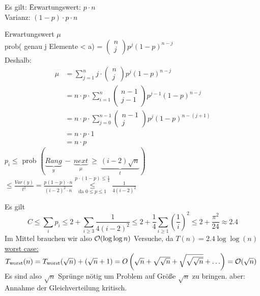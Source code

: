                 \begin{tabbing}
                    Es gilt: \= Erwartungswert: $p \cdot n$\\
                    \> Varianz: $(1-p)\cdot p \cdot n$
                \end{tabbing}
                    Erwartungswert $\mu$\\
                prob( genau j Elemente < a) = $\begin{pmatrix}
                                n \\ j
                                           \end{pmatrix} p^{j} (1-p)^{n-j}$\\
                Deshalb: 
                \begin{align*}
                    \mu &= \sum \limits_{j=1}^{n} j \cdot \begin{pmatrix}
                    n \\ j
                    \end{pmatrix} p^{j} (1-p)^{n-j}\\
                    &= n \cdot p \cdot \sum \limits_{i=1}^{n} \begin{pmatrix}
                    n-1 \\ j-1
                    \end{pmatrix} p^{j-1} (1-p)^{n-j}\\
                    &= n \cdot p \cdot \sum \limits_{j=0}^{n-1} \begin{pmatrix}
                    n-1 \\ j
                    \end{pmatrix} p^{j} (1-p)^{n-(j+1)}\\
                    &= n \cdot p \cdot 1\\
                    &= n \cdot p
                \end{align*}
                $p_i \leq$ prob $\left( \underbrace{Rang}_{y}~-~\underbrace{next}_{\mu}~\geq~\underbrace{(i-2) \sqrt{n}}_{t} \right)$\\
                $\leq \frac{Var(y)}{t^2} = \frac{p(1-p)\cdot n}{(i-2)^{2} \cdot n} 
                	\overset{p\cdot(1-p)\leq \frac{1}{4}}{\underset{\text{da } 0\leq p\leq 1}{\leq}} \frac{1}{4(i-2)^{2}}$
            
                Es gilt
                $$
                    C \leq \sum_i p_{i} \leq 2 + \sum \limits_{i \geq 3} \frac{1}{4(i-2)^{2}} 
                    \leq 2+\frac{1}{4}\sum_{i\geq 1}{\left(\frac{1}{i}\right)^2}
                    \leq 2 + \frac{\pi^{2}}{24} \approx 2.4
                $$
                Im Mittel brauchen wir also $\mathcal{O}(\log\log n)$ Versuche, da $T(n)=2.4 \log \log (n)$ \\
                \underline{worst case:} \\
                $T_{\text{worst}} (n) = T_{\text{worst}} (\sqrt{n}) + (\sqrt{n} +1) = 
                O\left(\sqrt{n}+ \sqrt{\sqrt{n}} + \sqrt{\sqrt{\sqrt{n}}}+\ldots \right) = \mathcal{O}(\sqrt{n})$\\
                Es sind also $\sqrt{n}$ Sprünge nötig um Problem auf Größe $\sqrt{n}$ zu bringen.
                aber: Annahme der Gleichverteilung kritisch.
